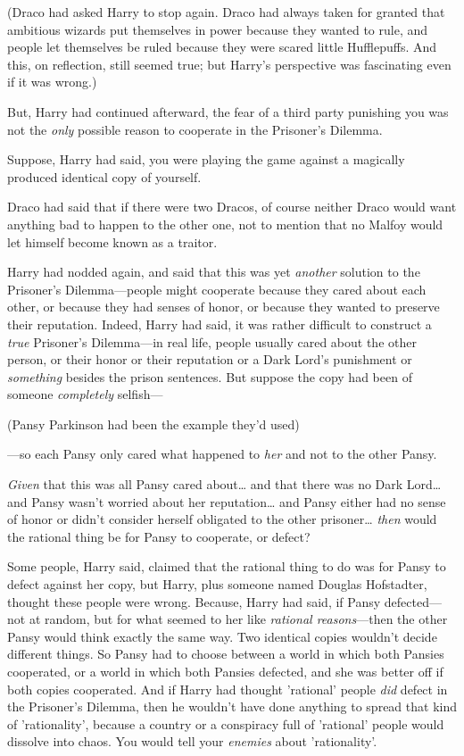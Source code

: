 (Draco had asked Harry to stop again. Draco had always taken for granted that 
ambitious wizards put themselves in power because they wanted to rule, and 
people let themselves be ruled because they were scared little Hufflepuffs. And 
this, on reflection, still seemed true; but Harry's perspective was fascinating 
even if it was wrong.)

But, Harry had continued afterward, the fear of a third party punishing you was 
not the \emph{only} possible reason to cooperate in the Prisoner's Dilemma.

Suppose, Harry had said, you were playing the game against a magically produced 
identical copy of yourself.

Draco had said that if there were two Dracos, of course neither Draco would 
want anything bad to happen to the other one, not to mention that no Malfoy 
would let himself become known as a traitor.

Harry had nodded again, and said that this was yet \emph{another} solution to 
the Prisoner's Dilemma---people might cooperate because they cared about each 
other, or because they had senses of honor, or because they wanted to preserve 
their reputation. Indeed, Harry had said, it was rather difficult to construct 
a \emph{true} Prisoner's Dilemma---in real life, people usually cared about the 
other person, or their honor or their reputation or a Dark Lord's punishment or 
\emph{something} besides the prison sentences. But suppose the copy had been of 
someone \emph{completely} selfish---

(Pansy Parkinson had been the example they'd used)

---so each Pansy only cared what happened to \emph{her} and not to the other 
Pansy.

\emph{Given} that this was all Pansy cared about{\ldots} and that there was no 
Dark Lord{\ldots} and Pansy wasn't worried about her reputation{\ldots} and 
Pansy either had no sense of honor or didn't consider herself obligated to the 
other prisoner{\ldots} \emph{then} would the rational thing be for Pansy to 
cooperate, or defect?

Some people, Harry said, claimed that the rational thing to do was for Pansy to 
defect against her copy, but Harry, plus someone named Douglas Hofstadter, 
thought these people were wrong. Because, Harry had said, if Pansy 
defected---not at random, but for what seemed to her like \emph{rational 
reasons}---then the other Pansy would think exactly the same way. Two identical 
copies wouldn't decide different things. So Pansy had to choose between a world 
in which both Pansies cooperated, or a world in which both Pansies defected, 
and she was better off if both copies cooperated. And if Harry had thought 
'rational' people \emph{did} defect in the Prisoner's Dilemma, then he wouldn't 
have done anything to spread that kind of 'rationality', because a country or a 
conspiracy full of 'rational' people would dissolve into chaos. You would tell 
your \emph{enemies} about 'rationality'.

